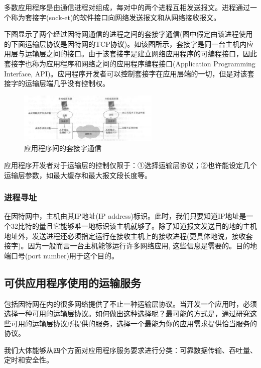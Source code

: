     多数应用程序是由通信进程对组成，每对中的两个进程互相发送报文。进程通过一个称为套接字(sock-et)的软件接口向网络发送报文和从网络接收报文。

    下图显示了两个经过因特网通信的进程之间的套接字通信(图中假定由该进程使用的下面运输层协议是因特网的TCP协议)。如该图所示，套接字是同一台主机内应用层与运输层之间的接口。由于该套接字是建立网络应用程序的可编程接口，因此套接字也称为应用程序和网络之间的应用程序编程接口(Application Programming Interface, API)。应用程序开发者可以控制套接字在应用层端的一切，但是对该套接字的运输层端几乎没有控制权。

\begin{figure}[!htbp]
    \centering
    \includegraphics[width=0.6\textwidth]{image/chapter02/应用进程通信.png}
    \caption{应用程序间的套接字通信}
\end{figure}

    应用程序开发者对于运输层的控制仅限于：①选择运输层协议；②也许能设定几个运输层参数，如最大缓存和最大报文段长度等。

\subsubsection{进程寻址}

    在因特网中，主机由其IP地址(IP address)标识。此时，我们只要知道IP地址是一个32比特的量且它能够唯一地标识该主机就够了。除了知道报文发送目的地的主机地址外，发送进程还必须指定运行在接收主机上的接收进程(更具体地说，接收套接字)。因为一般而言一台主机能够运行许多网络应用, 这些信息是需要的。目的地端口号(port number)用于这个目的。

\subsection{可供应用程序使用的运输服务}

    包括因特网在内的很多网络提供了不止一种运输层协议。当开发一个应用时，必须选择一种可用的运输层协议。如何做出这种选择呢？最可能的方式是，通过研究这些可用的运输层协议所提供的服务，选择一个最能为你的应用需求提供恰当服务的协议。

    我们大体能够从四个方面对应用程序服务要求进行分类：可靠数据传输、吞吐量、定时和安全性。

